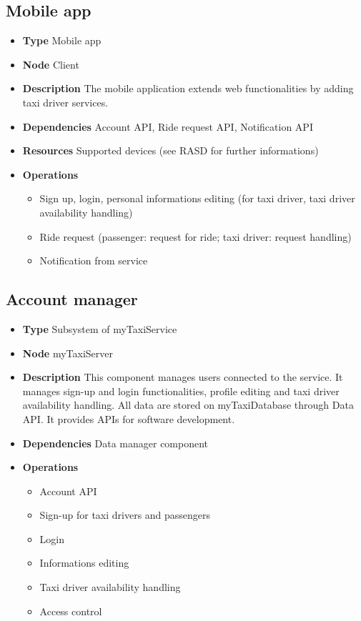 \subsection{Mobile app}
\begin{itemize}
	\item[]\textbf{Type} Mobile app
	\item[]\textbf{Node} Client
	\item[]\textbf{Description} The mobile application extends web functionalities by adding taxi driver services. 
	\item[]\textbf{Dependencies} Account API, Ride request API, Notification API
	\item[]\textbf{Resources} Supported devices (see RASD for further informations)
	\item[]\textbf{Operations} \begin{itemize}
		\item Sign up, login, personal informations editing (for taxi driver, taxi driver availability handling)
		\item Ride request (passenger: request for ride; taxi driver: request handling)
		\item Notification from service
	\end{itemize}
\end{itemize}

\subsection{Account manager}
\begin{itemize}
	\item[]\textbf{Type} Subsystem of myTaxiService
	\item[]\textbf{Node} myTaxiServer
	\item[]\textbf{Description} This component manages users connected to the service. It manages sign-up and login functionalities, profile editing and taxi driver availability handling. All data are stored on myTaxiDatabase through Data API. It provides APIs for software development.
	\item[]\textbf{Dependencies} Data manager component
	\item[]\textbf{Operations} \begin{itemize}
		\item Account API
		\item Sign-up for taxi drivers and passengers
		\item Login
		\item Informations editing
		\item Taxi driver availability handling	
		\item Access control
	\end{itemize}
\end{itemize}

